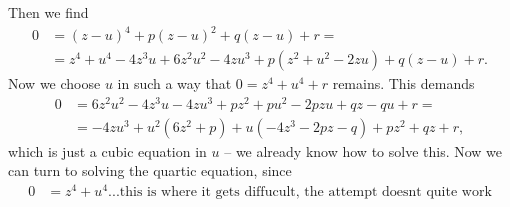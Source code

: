 \documentclass[english, parskip=full]{scrartcl}
\newcommand{\kla}{}
\begin{document}
Then we find
\begin{align}
0 &= (z-u)^4 + p(z-u)^2 + q(z-u) + r = \\
&= z^4 + u^4 - 4z^3u + 6z^2u^2 - 4zu^3 + p(z^2+u^2-2zu) + q(z-u) + r.
\end{align}
Now we choose $u$ in such a way that $0 = z^4 + u^4 + r$ remains.
This demands
\begin{align}
0 &= 6z^2u^2 - 4z^3u - 4zu^3 + pz^2 + pu^2 - 2pzu + qz - qu + r = \\
&= -4zu^3 + u^2\kla\left( 6z^2 + p \right) + u\kla\left( -4z^3 - 2pz - q \right) + pz^2+qz+r,
\end{align}
which is just a cubic equation in $u$ -- we already know how to solve this.
Now we can turn to solving the quartic equation, since
\begin{align}
0 &= z^4 + u^4... \text{this is where it gets diffucult, the attempt doesnt quite work}
\end{align}



\end{document}
